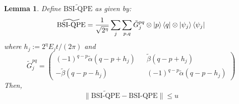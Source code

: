 \documentclass[aps,floatfix,10pt,amssymb,amsfont,amsmath,superscriptaddress,float,nofootinbib,longbibliography,nobalancelastpage,twocolumn]{revtex4-2}
\newtheorem{lemma}{Lemma}
\begin{document}
\begin{lemma}
\label{lemma:0}
    Define $\widetilde{\text{BSI-QPE}}$ as given by:
    \begin{equation}
       \widetilde{\text{BSI-QPE}}= \frac{1}{\sqrt{2^{\eta}}}\sum_j \sum_{p,q} \tilde G^{pq}_j \otimes \ket{p}\bra{q} \otimes \ket{\psi_j}\bra{\psi_j}
    \end{equation}
    where $h_j:=2^\eta E_jt/(2\pi)$ and
    \begin{equation}
        \tilde G^{pq}_j = \begin{pmatrix}
        (-1)^{q-p}\tilde\alpha(q-p+h_j) && \tilde\beta(q-p+h_j)\\
        -\tilde\beta(q-p-h_j) && (-1)^{q-p}\tilde\alpha(q-p-h_j)
    \end{pmatrix}
    \end{equation}
    Then,  
    \begin{equation}
        \|\widetilde{\text{BSI-QPE}}-\text{BSI-QPE}\| \leq u
    \end{equation}
\end{lemma}
\end{document}
